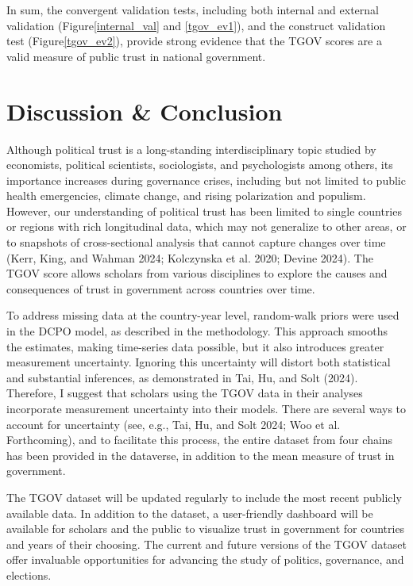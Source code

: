 \documentclass[
  12pt,
]{article}
\begin{document}
In sum, the convergent validation tests, including both internal and external validation (Figure\nobreakspace{}\ref{internal_val} and \nobreakspace{}\ref{tgov_ev1}), and the construct validation test (Figure\nobreakspace{}\ref{tgov_ev2}), provide strong evidence that the TGOV scores are a valid measure of public trust in national government.

\section{Discussion \& Conclusion}\label{discussion-conclusion}

Although political trust is a long-standing interdisciplinary topic studied by economists, political scientists, sociologists, and psychologists among others, its importance increases during governance crises, including but not limited to public health emergencies, climate change, and rising polarization and populism.
However, our understanding of political trust has been limited to single countries or regions with rich longitudinal data, which may not generalize to other areas, or to snapshots of cross-sectional analysis that cannot capture changes over time (Kerr, King, and Wahman 2024; Kolczynska et al. 2020; Devine 2024).
The TGOV score allows scholars from various disciplines to explore the causes and consequences of trust in government across countries over time.

To address missing data at the country-year level, random-walk priors were used in the DCPO model, as described in the methodology.
This approach smooths the estimates, making time-series data possible, but it also introduces greater measurement uncertainty.
Ignoring this uncertainty will distort both statistical and substantial inferences, as demonstrated in Tai, Hu, and Solt (2024).
Therefore, I suggest that scholars using the TGOV data in their analyses incorporate measurement uncertainty into their models.
There are several ways to account for uncertainty (see, e.g., Tai, Hu, and Solt 2024; Woo et al. Forthcoming), and to facilitate this process, the entire dataset from four chains has been provided in the dataverse, in addition to the mean measure of trust in government.

The TGOV dataset will be updated regularly to include the most recent publicly available data.
In addition to the dataset, a user-friendly dashboard will be available for scholars and the public to visualize trust in government for countries and years of their choosing.
The current and future versions of the TGOV dataset offer invaluable opportunities for advancing the study of politics, governance, and elections.
\end{document}
